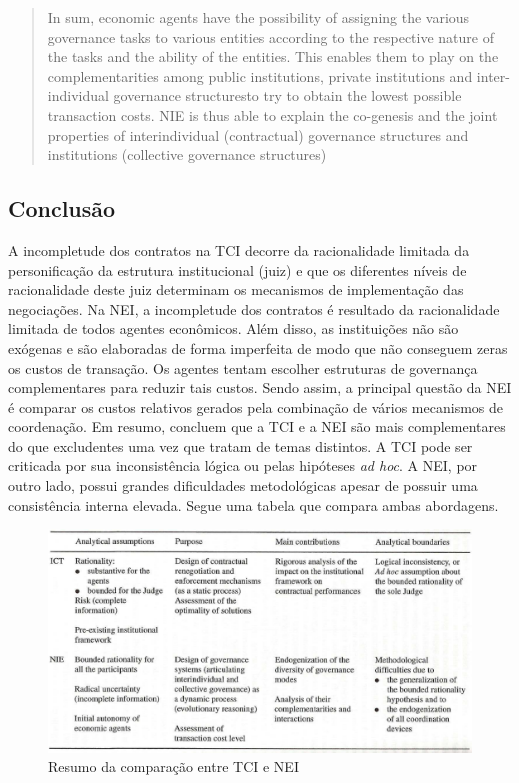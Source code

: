 \begin{quote}
	In sum, economic agents have the possibility of assigning the various governance tasks to various entities according to the respective nature of the tasks and the ability of the entities. This enables them to play on the complementarities among public institutions, private institutions and inter-individual governance structuresto try to obtain the lowest possible transaction costs. NIE is thus able to explain the co-genesis and the joint properties of interindividual (contractual) governance structures and institutions (collective governance structures)
\end{quote}


\subsection*{Conclusão}

A incompletude dos contratos na TCI decorre da racionalidade limitada da personificação da estrutura institucional (juiz) e que os diferentes níveis de racionalidade deste juiz determinam os mecanismos de implementação das negociações. Na NEI, a incompletude dos contratos é resultado da racionalidade limitada de todos agentes econômicos. Além disso, as instituições não são exógenas e são elaboradas de forma imperfeita de modo que não conseguem zeras os custos de transação. Os agentes tentam escolher estruturas de governança complementares para reduzir tais custos. Sendo assim, a principal questão da NEI é comparar os custos relativos gerados pela combinação de vários mecanismos de coordenação. Em resumo, concluem que a TCI e a NEI são mais complementares do que excludentes uma vez que tratam de temas distintos. A TCI pode ser criticada por sua inconsistência lógica ou pelas hipóteses \textit{ad hoc}. A NEI, por outro lado, possui grandes dificuldades metodológicas apesar de possuir uma consistência interna elevada. Segue uma tabela que compara ambas abordagens.

\begin{figure}[h]
	\centering
	\caption{Resumo da comparação entre TCI e NEI}
	\label{fig:screenshot001}
	\includegraphics[width=\linewidth]{screenshot001}
\end{figure}
